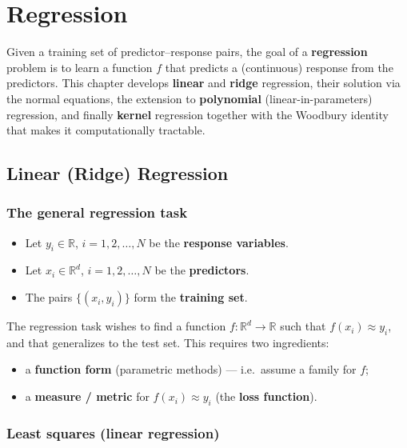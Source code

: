 \documentclass[
  letterpaper,
  DIV=11,
  numbers=noendperiod]{scrreprt}
\providecommand{\tightlist}{%
  \setlength{\itemsep}{0pt}\setlength{\parskip}{0pt}}
\theoremstyle{definition}
\theoremstyle{plain}
\theoremstyle{plain}
\theoremstyle{definition}
\theoremstyle{plain}
\theoremstyle{plain}
\theoremstyle{remark}
\begin{document}
\chapter{Regression}\label{regression}

Given a training set of predictor--response pairs, the goal of a
\textbf{regression} problem is to learn a function \(f\) that predicts a
(continuous) response from the predictors. This chapter develops
\textbf{linear} and \textbf{ridge} regression, their solution via the
normal equations, the extension to \textbf{polynomial}
(linear-in-parameters) regression, and finally \textbf{kernel}
regression together with the Woodbury identity that makes it
computationally tractable.

\section{Linear (Ridge) Regression}\label{linear-ridge-regression}

\subsection{The general regression
task}\label{the-general-regression-task}

\begin{itemize}
\tightlist
\item
  Let \(y_i \in \mathbb{R}\), \(i = 1, 2, \dots, N\) be the
  \textbf{response variables}.
\item
  Let \(x_i \in \mathbb{R}^d\), \(i = 1, 2, \dots, N\) be the
  \textbf{predictors}.
\item
  The pairs \(\{(x_i, y_i)\}\) form the \textbf{training set}.
\end{itemize}

The regression task wishes to find a function
\(f : \mathbb{R}^d \to \mathbb{R}\) such that \(f(x_i) \approx y_i\),
and that generalizes to the test set. This requires two ingredients:

\begin{itemize}
\tightlist
\item
  a \textbf{function form} (parametric methods) --- i.e.~assume a family
  for \(f\);
\item
  a \textbf{measure / metric} for \(f(x_i) \approx y_i\) (the
  \textbf{loss function}).
\end{itemize}

\subsection{Least squares (linear
regression)}\label{least-squares-linear-regression}
\end{document}

